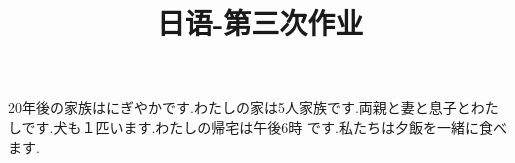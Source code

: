 
\usepackage{../../homeworks_preamble}
\title{日语-第三次作业}


    \maketitle
    20年後の家族はにぎやかです.わたしの家は5人家族です.両親と妻と息子とわたしです.犬も１匹います.わたしの帰宅は午後6時
です.私たちは夕飯を一緒に食べます.
